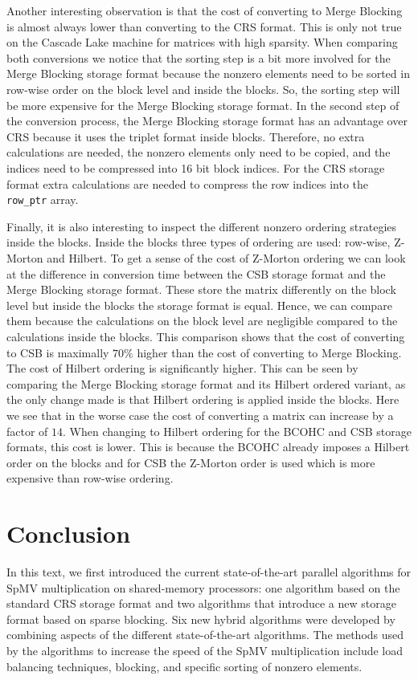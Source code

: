 \documentclass{siamart220329}
\begin{document}
Another interesting observation is that the cost of converting to Merge Blocking is almost always lower than converting to the CRS format. This is only not true on the Cascade Lake machine for matrices with high sparsity. When comparing both conversions we notice that the sorting step is a bit more involved for the Merge Blocking storage format because the nonzero elements need to be sorted in row-wise order on the block level and inside the blocks. So, the sorting step will be more expensive for the Merge Blocking storage format. In the second step of the conversion process, the Merge Blocking storage format has an advantage over CRS because it uses the triplet format inside blocks. Therefore, no extra calculations are needed, the nonzero elements only need to be copied, and the indices need to be compressed into 16 bit block indices. For the CRS storage format extra calculations are needed to compress the row indices into the \texttt{row\_ptr} array.

Finally, it is also interesting to inspect the different nonzero ordering strategies inside the blocks. Inside the blocks three types of ordering are used: row-wise, Z-Morton and Hilbert. To get a sense of the cost of Z-Morton ordering we can look at the difference in conversion time between the CSB storage format and the Merge Blocking storage format. These store the matrix differently on the block level but inside the blocks the storage format is equal. Hence, we can compare them because the calculations on the block level are negligible compared to the calculations inside the blocks. This comparison shows that the cost of converting to CSB is maximally $70\%$ higher than the cost of converting to Merge Blocking. The cost of Hilbert ordering is significantly higher. This can be seen by comparing the Merge Blocking  storage format and its Hilbert ordered variant, as the only change made is that Hilbert ordering is applied inside the blocks. Here we see that in the worse case the cost of converting a matrix can increase by a factor of $14$. When changing to Hilbert ordering for the BCOHC and CSB storage formats, this cost is lower. This is because the BCOHC already imposes a Hilbert order on the blocks and for CSB the Z-Morton order is used which is more expensive than row-wise ordering. 

\section{Conclusion}\label{sec:conclusion}
In this text, we first introduced the current state-of-the-art parallel algorithms for SpMV multiplication on shared-memory processors: one algorithm based on the standard CRS storage format and two algorithms that introduce a new storage format based on sparse blocking. Six new hybrid algorithms were developed by combining aspects of the different state-of-the-art algorithms. The methods used by the algorithms to increase the speed of the SpMV multiplication include load balancing techniques, blocking, and specific sorting of nonzero elements.
\end{document}
